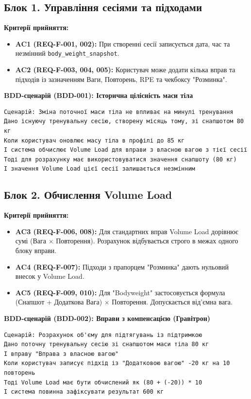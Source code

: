 \documentclass[12pt]{article}
\begin{document}
\subsection{Блок 1. Управління сесіями та підходами}
\textbf{Критерії прийняття:}
\begin{itemize}
    \item \textbf{AC1 (REQ-F-001, 002):} При створенні сесії записується дата, час та незмінний \texttt{body\_weight\_snapshot}.
    \item \textbf{AC2 (REQ-F-003, 004, 005):} Користувач може додати кілька вправ та підходів із зазначенням Ваги, Повторень, RPE та чекбоксу "Розминка".
\end{itemize}

\textbf{BDD-сценарій (BDD-001): Історична цілісність маси тіла}
\begin{verbatim}
Сценарій: Зміна поточної маси тіла не впливає на минулі тренування
Дано існуючу тренувальну сесію, створену місяць тому, зі снапшотом 80 кг
Коли користувач оновлює масу тіла в профілі до 85 кг
І система обчислює Volume Load для вправи з власною вагою з тієї сесії
Тоді для розрахунку має використовуватися значення снапшоту (80 кг)
І значення Volume Load цієї сесії залишається незмінним
\end{verbatim}

\subsection{Блок 2. Обчислення Volume Load}
\textbf{Критерії прийняття:}
\begin{itemize}
    \item \textbf{AC3 (REQ-F-006, 008):} Для стандартних вправ Volume Load дорівнює сумі (Вага $\times$ Повторення). Розрахунок відбувається строго в межах одного блоку вправи.
    \item \textbf{AC4 (REQ-F-007):} Підходи з прапорцем "Розминка" дають нульовий внесок у Volume Load.
    \item \textbf{AC5 (REQ-F-009, 010):} Для "Bodyweight" застосовується формула (Снапшот + Додаткова Вага) $\times$ Повторення. Допускається від'ємна вага.
\end{itemize}

\textbf{BDD-сценарій (BDD-002): Вправи з компенсацією (Гравітрон)}
\begin{verbatim}
Сценарій: Розрахунок об'єму для підтягувань із підтримкою
Дано поточну тренувальну сесію зі снапшотом маси тіла 80 кг
І вправу "Вправа з власною вагою"
Коли користувач записує підхід із "Додатковою вагою" -20 кг на 10 повторень
Тоді Volume Load має бути обчислений як (80 + (-20)) * 10
І система повинна зафіксувати результат 600 кг
\end{verbatim}
\end{document}
